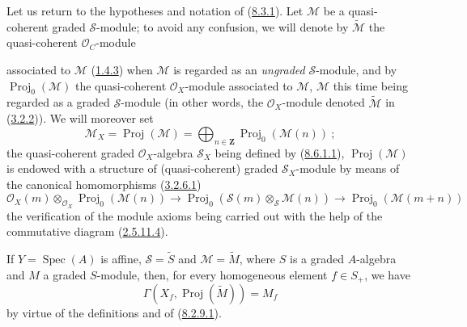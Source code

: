 \begin{env}[8.12.1]
\label{II.8.12.1}
Let us return to the hypotheses and notation of
(\hyperref[II.8.3.1]{8.3.1}). Let $\mathcal{M}$ be a quasi-coherent
graded $\mathcal{S}$-module; to avoid any confusion, we will denote by
$\widetilde{\mathcal{M}}$ the quasi-coherent $\mathcal{O}_C$-module

associated to $\mathcal{M}$
(\hyperref[II.1.4.3]{1.4.3}) when $\mathcal{M}$ is regarded as an
\emph{ungraded} $\mathcal{S}$-module, and by
$\operatorname{Proj}_0(\mathcal{M})$ the quasi-coherent
$\mathcal{O}_X$-module associated to $\mathcal{M}$, $\mathcal{M}$ this time
being regarded as a graded $\mathcal{S}$-module (in other words, the
$\mathcal{O}_X$-module denoted $\widetilde{\mathcal{M}}$ in
(\hyperref[II.3.2.2]{3.2.2})). We will moreover set
\begin{equation}
\label{II.8.12.1.1}
  \mathcal{M}_X=\operatorname{Proj}(\mathcal{M})
  =\bigoplus_{n\in\mathbf{Z}}\operatorname{Proj}_0(\mathcal{M}(n))~;
\tag{8.12.1.1}
\end{equation}
the quasi-coherent graded $\mathcal{O}_X$-algebra $\mathcal{S}_X$ being
defined by (\hyperref[II.8.6.1.1]{8.6.1.1}),
$\operatorname{Proj}(\mathcal{M})$ is endowed with a structure of
(quasi-coherent) graded $\mathcal{S}_X$-module by means of the canonical
homomorphisms (\hyperref[II.3.2.6.1]{3.2.6.1})
\begin{equation}
\label{II.8.12.1.2}
  \mathcal{O}_X(m)\otimes_{\mathcal{O}_X}
  \operatorname{Proj}_0(\mathcal{M}(n))
  \to \operatorname{Proj}_0(\mathcal{S}(m)\otimes_{\mathcal{S}}\mathcal{M}(n))
  \to \operatorname{Proj}_0(\mathcal{M}(m+n))
\tag{8.12.1.2}
\end{equation}
the verification of the module axioms being carried out with the help of the
commutative diagram (\hyperref[II.2.5.11.4]{2.5.11.4}).

If $Y=\operatorname{Spec}(A)$ is affine, $\mathcal{S}=\widetilde{S}$ and
$\mathcal{M}=\widetilde{M}$, where $S$ is a graded $A$-algebra and $M$ a
graded $S$-module, then, for every homogeneous element $f\in S_+$, we have
\begin{equation}
\label{II.8.12.1.3}
  \Gamma(X_f,\operatorname{Proj}(\widetilde{M}))=M_f
\tag{8.12.1.3}
\end{equation}
by virtue of the definitions and of (\hyperref[II.8.2.9.1]{8.2.9.1}).


\end{env}
